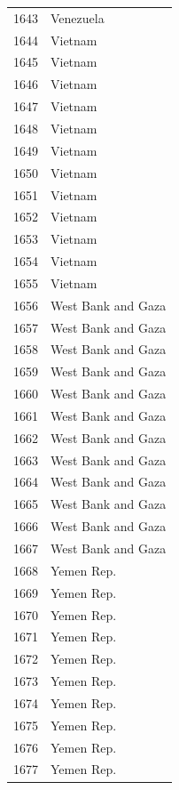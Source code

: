 \documentclass[
  letterpaper,
  DIV=11,
  numbers=noendperiod]{scrreprt}
\begin{document}
\begin{tabular}{ll}
1643 &                 Venezuela \\
1644 &                   Vietnam \\
1645 &                   Vietnam \\
1646 &                   Vietnam \\
1647 &                   Vietnam \\
1648 &                   Vietnam \\
1649 &                   Vietnam \\
1650 &                   Vietnam \\
1651 &                   Vietnam \\
1652 &                   Vietnam \\
1653 &                   Vietnam \\
1654 &                   Vietnam \\
1655 &                   Vietnam \\
1656 &        West Bank and Gaza \\
1657 &        West Bank and Gaza \\
1658 &        West Bank and Gaza \\
1659 &        West Bank and Gaza \\
1660 &        West Bank and Gaza \\
1661 &        West Bank and Gaza \\
1662 &        West Bank and Gaza \\
1663 &        West Bank and Gaza \\
1664 &        West Bank and Gaza \\
1665 &        West Bank and Gaza \\
1666 &        West Bank and Gaza \\
1667 &        West Bank and Gaza \\
1668 &                Yemen Rep. \\
1669 &                Yemen Rep. \\
1670 &                Yemen Rep. \\
1671 &                Yemen Rep. \\
1672 &                Yemen Rep. \\
1673 &                Yemen Rep. \\
1674 &                Yemen Rep. \\
1675 &                Yemen Rep. \\
1676 &                Yemen Rep. \\
1677 &                Yemen Rep. \\

\end{tabular}
\end{document}
